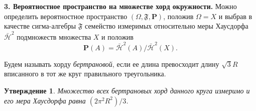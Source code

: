 \documentclass[12pt]{article}
\newtheorem{prep}{Утверждение}
\renewcommand{\Pr}{{\mathbf P}}
\begin{document}
\bigskip

\textbf{3. Вероятностное пространство на множестве хорд окружности.}  %
Можно определить вероятностное пространство $(\Omega,\mathfrak F, \Pr)$, положив
$\Omega=X$ и выбрав в качестве сигма-алгебры $\mathfrak F$ семейство измеримых
относительно меры Хаусдорфа $\bar{\mathcal H}^2$ подмножеств множества $X$ и
положив
$$
\Pr(A)=\bar{\mathcal H}^2(A) / \bar{\mathcal H}^2(X).
$$

Будем называть хорду \emph{бертрановой}, если ее длина превосходит длину
$\sqrt{3} R$ вписанного в тот же круг правильного треугольника.

\begin{prep}
  Множество всех бертрановых хорд данного круга измеримо и его мера Хаусдорфа
  равна $(2\pi^2 R^2)/3$.
\end{prep}
\end{document}
